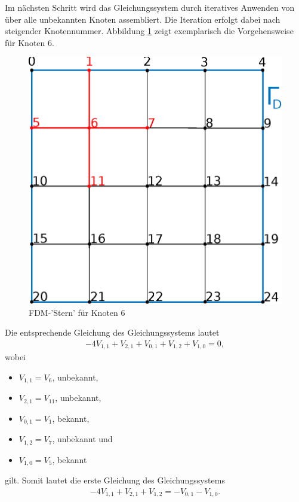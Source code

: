 Im nächsten Schritt wird das Gleichungssystem  durch iteratives Anwenden von  über alle unbekannten Knoten assembliert. Die Iteration erfolgt dabei nach steigender Knotennummer.\newline
Abbildung \ref{fig:grid_2} zeigt exemplarisch die Vorgehensweise für Knoten 6.

\begin{figure}[htbp]
	\centering
	\includegraphics[scale=1]{pics/grid_2.eps}
	\caption{FDM-'Stern' für Knoten 6}
	\label{fig:grid_2}
\end{figure}

Die entsprechende Gleichung des Gleichungssystems lautet
\begin{align*}
	-4V_{1,1} + V_{2,1} + V_{0,1} + V_{1,2} + V_{1,0} = 0,
\end{align*} wobei 
\begin{itemize}
\item $V_{1,1} = V_6$, unbekannt,
\item $V_{2,1} = V_{11}$, unbekannt,
\item $V_{0,1} = V_1$, bekannt,
\item $V_{1,2} = V_7$, unbekannt und
\item $V_{1,0} = V_5$, bekannt
\end{itemize}
gilt.
Somit lautet die erste Gleichung des Gleichungssystems
\begin{align}
	-4V_{1,1} + V_{2,1} + V_{1,2} = -V_{0,1} - V_{1,0}.
\end{align}

